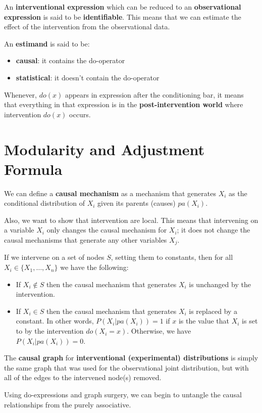 An \textbf{interventional expression} which can be reduced to an \textbf{observational expression}
is said to be \textbf{identifiable}. This means that we can estimate the effect
of the intervention from the observational data.

An \textbf{estimand} is said to be:
\begin{itemize}
      \item \textbf{causal}: it contains the do-operator
      \item \textbf{statistical}: it doesn't contain the do-operator
\end{itemize}

Whenever, $do(x)$ appears in expression after the conditioning bar, it means
that everything in that expression is in the \textbf{post-intervention world}
where intervention $do(x)$ occurs.


\section{Modularity and Adjustment Formula}
We can define a \textbf{causal mechanism} as a mechanism that generates $X_i$ as
the conditional distribution of $X_i$ given its parents (causes) $pa(X_i)$.

Also, we want to show that intervention are local. This means that intervening on
a variable $X_i$ only changes the causal mechanism for $X_i$; it does not change
the causal mechanisms that generate any other variables $X_j$.
\begin{definition}
      If we intervene on a set of nodes $S$, setting them to constants, then for
      all $X_i \in \{X_1, \ldots, X_n\}$ we have the following:
      \begin{itemize}
            \item If $X_i \notin S$ then the causal mechanism that generates $X_i$
                  is unchanged by the intervention.
            \item If $X_i \in S$ then the causal mechanism that generates $X_i$ is
                  replaced by a constant. In other words, $P(X_i | pa(X_i)) = 1$
                  if $x$ is the value that $X_i$ is set to by the intervention
                  $do(X_i = x)$. Otherwise, we have $P(X_i | pa(X_i)) = 0$.
      \end{itemize}
\end{definition}
\begin{note}
      The \textbf{causal graph} for \textbf{interventional (experimental) distributions} is simply
      the same graph that was used for the observational joint distribution, but
      with all of the edges to the intervened node(s) removed.
\end{note}
Using do-expressions and graph surgery, we can begin to untangle the causal
relationships from the purely associative.



